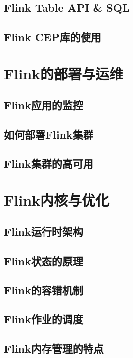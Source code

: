 \documentclass[cn,11pt,chinese]{elegantbook}
\begin{document}
\chapter{Flink Table API \& SQL}

\chapter{Flink CEP库的使用}

\part{Flink的部署与运维}

\chapter{Flink应用的监控}

\chapter{如何部署Flink集群}

\chapter{Flink集群的高可用}

\part{Flink内核与优化}

\chapter{Flink运行时架构}

\chapter{Flink状态的原理}

\chapter{Flink的容错机制}

\chapter{Flink作业的调度}

\chapter{Flink内存管理的特点}
\end{document}
